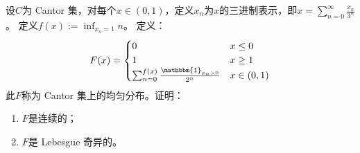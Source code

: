 \documentclass{ctexart}
\newif\ifpreface
\begin{document}
\large
\setlength{\baselineskip}{1.2em}
\ifpreface

\newgeometry{left=2cm,right=2cm,top=2cm,bottom=2cm}
\else
{}
\maketitle
\fi
\begin{problem}\label{pro:3.38}
  设\(C \)为 Cantor 集，对每个\(x \in (0,1) \)，定义\(x_n \)为\(x \)的三进制表示，即\(x = \sum_{n=0}^{\infty}\frac{x_n}{3^n} \)。
  定义\(f(x):= \inf_{x_n = 1}n \)。
  定义：
  \begin{equation}\label{equ:1}
    F(x) =
    \begin{cases}
      0 & x \leq 0\\
      1 & x \geq 1\\
      \sum_{n=0}^{f(x)}\frac{\mathbbm{1}_{x_n>0}}{2^{n}} & x \in (0,1)
    \end{cases}
  \end{equation}
  此\(F \)称为 Cantor 集上的均匀分布。证明：
  \begin{enumerate}
    \item \(F \)是连续的；
    \item \(F \)是 Lebesgue 奇异的。
  \end{enumerate}
\end{problem}
\end{document}
